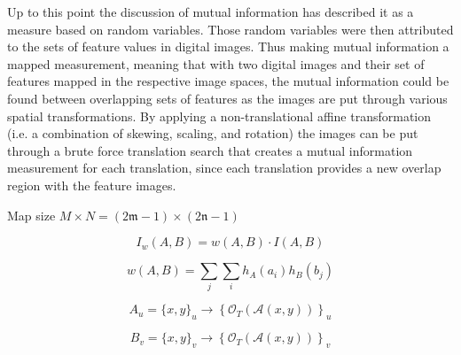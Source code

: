 %
%
%
%
%
%

%
%
%



Up to this point the discussion of mutual information has described it as a measure based on random variables. Those random variables were then attributed to the sets of feature values in digital images. Thus making mutual information a mapped measurement, meaning that with two digital images and their set of features mapped in the respective image spaces, the mutual information could be found between overlapping sets of features as the images are put through various spatial transformations. By applying a non-translational affine transformation (i.e. a combination of skewing, scaling, and rotation) the images can be put through a brute force translation search that creates a mutual information measurement for each translation, since each translation provides a new overlap region with the feature images.

Map size $M \times N = (2\mathfrak{m}-1) \times (2\mathfrak{n}-1)$

\begin{equation}
\label{WeightedInformation}
	I_{w}(A,B)=w(A,B) \cdot I(A,B)
\end{equation}


\begin{equation}
\label{}
w(A,B)=\sum_{j}\sum_{i}{h_{A}(a_{i})h_{B}(b_{j})}
\end{equation}


\begin{equation}
\label{}
A_{u}=\{x,y\}_{u} \rightarrow \left\{ \mathcal{O}_{T}\left(\mathcal{A}(x,y) \right) \right\}_{u} 
\end{equation}


\begin{equation}
\label{}
B_{v}=\{x,y\}_{v} \rightarrow \left\{ \mathcal{O}_{T}\left(\mathcal{A}(x,y) \right) \right\}_{v}
\end{equation}


